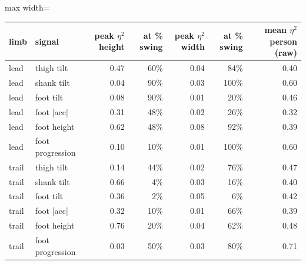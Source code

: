 \begin{adjustbox}{max width=\textwidth}
{\footnotesize
\begin{tabular}{llrrrrr}
\toprule
\textbf{limb} & \textbf{signal} & \textbf{peak $\eta^2$ height} & \textbf{at \% swing} & \textbf{peak $\eta^2$ width} & \textbf{at \% swing} & \textbf{mean $\eta^2$ person (raw)} \\
\midrule
lead & thigh tilt & 0.47 & 60\% & 0.04 & 84\% & 0.40 \\
lead & shank tilt & 0.04 & 90\% & 0.03 & 100\% & 0.60 \\
lead & foot tilt & 0.08 & 90\% & 0.01 & 20\% & 0.46 \\
lead & foot |acc| & 0.31 & 48\% & 0.02 & 26\% & 0.32 \\
lead & foot height & 0.62 & 48\% & 0.08 & 92\% & 0.39 \\
lead & foot progression & 0.10 & 10\% & 0.01 & 100\% & 0.60 \\
trail & thigh tilt & 0.14 & 44\% & 0.02 & 76\% & 0.47 \\
trail & shank tilt & 0.66 & 4\% & 0.03 & 16\% & 0.40 \\
trail & foot tilt & 0.36 & 2\% & 0.05 & 6\% & 0.42 \\
trail & foot |acc| & 0.32 & 10\% & 0.01 & 66\% & 0.39 \\
trail & foot height & 0.76 & 20\% & 0.04 & 62\% & 0.48 \\
trail & foot progression & 0.03 & 50\% & 0.03 & 80\% & 0.71 \\
\bottomrule
\end{tabular}
}
\end{adjustbox}
